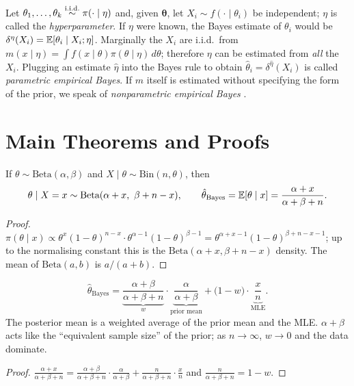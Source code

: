 \documentclass[main.tex]{subfiles}
\begin{document}
\begin{definition}\label{def:ampirik-bayes}
Let $\theta_1,\dots,\theta_k\overset{\text{i.i.d.}}{\sim}\pi(\cdot\mid\eta)$ and, given $\bm\theta$, let $X_i\sim f(\cdot\mid\theta_i)$ be independent; $\eta$ is called the \emph{hyperparameter}. If $\eta$ were known, the Bayes estimate of $\theta_i$ would be $\delta^{\eta}(X_i)=\mathbb{E}[\theta_i\mid X_i;\eta]$. Marginally the $X_i$ are i.i.d.\ from $m(x\mid\eta)=\int f(x\mid\theta)\pi(\theta\mid\eta)\,d\theta$; therefore $\eta$ can be estimated from \emph{all} the $X_i$. Plugging an estimate $\hat\eta$ into the Bayes rule to obtain $\hat\theta_i=\delta^{\hat\eta}(X_i)$ is called \emph{parametric empirical Bayes}. If $m$ itself is estimated without specifying the form of the prior, we speak of \emph{nonparametric empirical Bayes} \cite{robbins56}.
\end{definition}

\section{Main Theorems and Proofs}

\begin{theorem}\label{thm:beta-binom}
If $\theta\sim\text{Beta}(\alpha,\beta)$ and $X\mid\theta\sim\text{Bin}(n,\theta)$, then
\[
\theta \mid X=x \sim \text{Beta}(\alpha + x,\ \beta + n - x),\qquad \hat{\theta}_{\text{Bayes}} =\mathbb{E}[\theta\mid x]= \frac{\alpha + x}{\alpha + \beta + n}.
\]
\end{theorem}
\begin{proof}
$\pi(\theta\mid x)\propto\theta^x(1-\theta)^{n-x}\cdot\theta^{\alpha-1}(1-\theta)^{\beta-1}=\theta^{\alpha+x-1}(1-\theta)^{\beta+n-x-1}$; up to the normalising constant this is the $\text{Beta}(\alpha+x,\beta+n-x)$ density. The mean of $\text{Beta}(a,b)$ is $a/(a+b)$.
\end{proof}

\begin{corollary}\label{cor:buzme}
\[
\hat\theta_{\text{Bayes}}=\underbrace{\frac{\alpha+\beta}{\alpha+\beta+n}}_{w}\cdot\underbrace{\frac{\alpha}{\alpha+\beta}}_{\text{prior mean}}+\Big(1-w\Big)\cdot\underbrace{\frac{x}{n}}_{\text{MLE}} .
\]
The posterior mean is a weighted average of the prior mean and the MLE. $\alpha+\beta$ acts like the ``equivalent sample size'' of the prior; as $n\to\infty$, $w\to0$ and the data dominate.
\end{corollary}
\begin{proof}
$\frac{\alpha+x}{\alpha+\beta+n}=\frac{\alpha+\beta}{\alpha+\beta+n}\cdot\frac{\alpha}{\alpha+\beta}+\frac{n}{\alpha+\beta+n}\cdot\frac xn$ and $\frac{n}{\alpha+\beta+n}=1-w$.
\end{proof}
\end{document}
